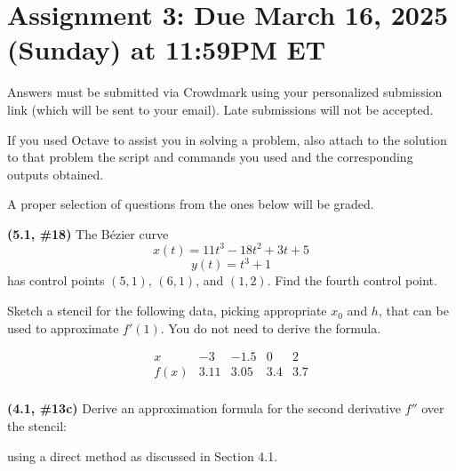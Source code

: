 \documentclass{eh-homework}
\begin{document}
\usetikzlibrary{arrows.meta}
\section*{Assignment 3: Due March 16, 2025 (Sunday) at 11:59PM ET}

Answers must be submitted via Crowdmark using your personalized submission link (which will be sent to your email). Late submissions will not be accepted.

If you used Octave to assist you in solving a problem, also attach to the solution to that problem the script and commands you used and the corresponding outputs obtained.

A proper selection of questions from the ones below will be graded.

\begin{question}{1}
\textbf{(5.1, \#18)} The Bézier curve
\[
x(t) = 11t^3 - 18t^2 + 3t + 5
\]
\[
y(t) = t^3 + 1
\]
has control points \((5,1)\), \((6,1)\), and \((1,2)\). Find the fourth control point.
\end{question}

\begin{question}{2}
Sketch a stencil for the following data, picking appropriate \(x_0\) and \(h\), that can be used to approximate \(f'(1)\). You do not need to derive the formula.

\[
\begin{array}{c|cccc}
x & -3 & -1.5 & 0 & 2 \\
\hline
f(x) & 3.11 & 3.05 & 3.4 & 3.7 \\
\end{array}
\]
\end{question}

\begin{question}{3}
\textbf{(4.1, \#13c)} Derive an approximation formula for the second derivative \( f'' \) over the stencil:

\begin{center}
\end{center}

using a direct method as discussed in Section 4.1.
\end{question}
\end{document}
